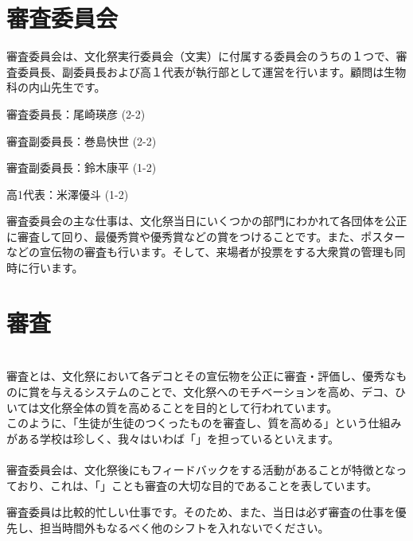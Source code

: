 \documentclass[paper=b4j, landscape, fleqn, jafontsize=8pt, jafontscale=1, head_space=25.5mm, foot_space=15mm, fore-edge=14.5mm, gutter=14.5mm, hanging_punctuation]{jlreq}
\begin{document}
\begin{normalmaterial}
\section{審査委員会}
審査委員会は、文化祭実行委員会（文実）に付属する委員会のうちの１つで、審査委員長、副委員長および高１代表が執行部として運営を行います。顧問は生物科の内山先生です。

\begin{reitemize}
    \item 審査委員長：尾崎瑛彦 (2-2) 
    \item 審査副委員長：巻島快世 (2-2)
    \item 審査副委員長：鈴木康平 (1-2)
    \item 高1代表：米澤優斗 (1-2)
\end{reitemize}
審査委員会の主な仕事は、文化祭当日にいくつかの部門にわかれて各団体を公正に審査して回り、最優秀賞や優秀賞などの賞をつけることです。また、ポスターなどの宣伝物の審査も行います。そして、来場者が投票をする大衆賞の管理も同時に行います。

\section{審査}
\\
審査とは、文化祭において各デコとその宣伝物を公正に審査・評価し、優秀なものに賞を与えるシステムのことで、文化祭へのモチベーションを高め、デコ、ひいては文化祭全体の質を高めることを目的として行われています。\\
このように、「生徒が生徒のつくったものを審査し、質を高める」という仕組みがある学校は珍しく、我々はいわば「」を担っているといえます。\\
\\
審査委員会は、文化祭後にもフィードバックをする活動があることが特徴となっており、これは、「」ことも審査の大切な目的であることを表しています。

審査委員は比較的忙しい仕事です。そのため、また、当日は必ず審査の仕事を優先し、担当時間外もなるべく他のシフトを入れないでください。


\end{normalmaterial}
\end{document}
